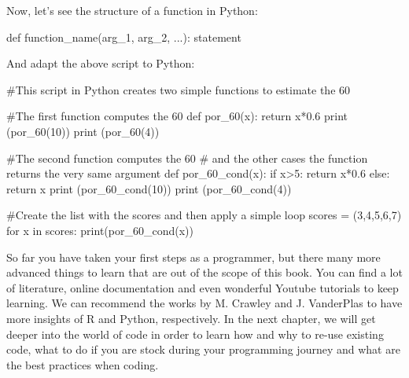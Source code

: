 Now, let’s see the structure of a function in Python:

\begin{examplepy}
def function_name(arg_1, arg_2, ...):
  statement
\end{examplepy}

And adapt the above script to Python:

\begin{examplepy}
#This script in Python creates two simple functions to estimate the 60%

#The first function computes the 60%
def por_60(x):
  return x*0.6
print (por_60(10))
print (por_60(4))

#The second function computes the 60%
# and the other cases the function returns the very same argument
def por_60_cond(x):
  if x>5:
    return x*0.6
  else:
    return x
print (por_60_cond(10))
print (por_60_cond(4))

#Create the list with the scores and then apply a simple loop
scores = (3,4,5,6,7)
for x in scores:
  print(por_60_cond(x))
\end{examplepy}

So far you have taken your first steps as a programmer, but there many more advanced things to learn that are out of the scope of this book. You can find a lot of literature, online documentation and even wonderful Youtube tutorials to keep learning. We can recommend the works by M. Crawley\cite{crawley2012r}  and J. VanderPlas\cite{vanderplas2016python}  to have more insights of R and Python, respectively. In the next chapter, we will get deeper into the world of code in order to learn how and why to re-use existing code, what to do if you are stock during your programming journey and what are the best practices when coding.
